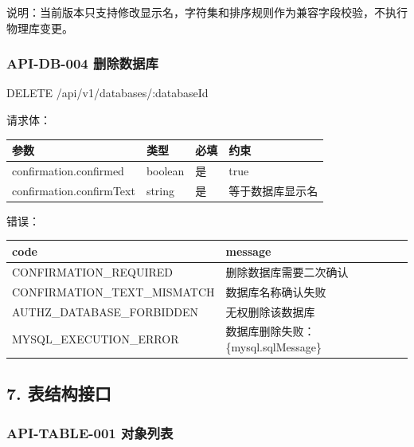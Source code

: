 \documentclass[
  a4paper,
  UTF8]{ctexart}
\newenvironment{Shaded}{}{}
\newcommand{\NormalTok}[1]{#1}
\begin{document}
说明：当前版本只支持修改显示名，字符集和排序规则作为兼容字段校验，不执行物理库变更。

\hypertarget{api-db-004-ux5220ux9664ux6570ux636eux5e93}{%
\subsubsection{API-DB-004
删除数据库}\label{api-db-004-ux5220ux9664ux6570ux636eux5e93}}

\begin{Shaded}
\begin{Highlighting}[]
\NormalTok{DELETE /api/v1/databases/:databaseId}
\end{Highlighting}
\end{Shaded}

请求体：

\begin{longtable}[]{@{}llll@{}}
\toprule
参数 & 类型 & 必填 & 约束 \\
\midrule
\endhead
confirmation.confirmed & boolean & 是 & true \\
confirmation.confirmText & string & 是 & 等于数据库显示名 \\
\bottomrule
\end{longtable}

错误：

\begin{longtable}[]{@{}ll@{}}
\toprule
code & message \\
\midrule
\endhead
CONFIRMATION\_REQUIRED & 删除数据库需要二次确认 \\
CONFIRMATION\_TEXT\_MISMATCH & 数据库名称确认失败 \\
AUTHZ\_DATABASE\_FORBIDDEN & 无权删除该数据库 \\
MYSQL\_EXECUTION\_ERROR & 数据库删除失败：\{mysql.sqlMessage\} \\
\bottomrule
\end{longtable}

\hypertarget{ux8868ux7ed3ux6784ux63a5ux53e3}{%
\subsection{7. 表结构接口}\label{ux8868ux7ed3ux6784ux63a5ux53e3}}

\hypertarget{api-table-001-ux5bf9ux8c61ux5217ux8868}{%
\subsubsection{API-TABLE-001
对象列表}\label{api-table-001-ux5bf9ux8c61ux5217ux8868}}
\end{document}
